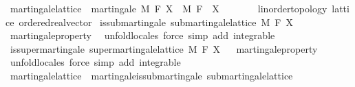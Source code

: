 \begin{isabellebody}
\isanewline
{}\isamarkupfalse%
\ martingale{\isacharunderscore}{\kern0pt}lattice\ {\isacharequal}{\kern0pt}\ martingale\ M\ F\ X\ \ M\ F\ \ X\ {\isacharcolon}{\kern0pt}{\isacharcolon}{\kern0pt}\ {\isachardoublequoteopen}{\isacharunderscore}{\kern0pt}\ {\isasymRightarrow}\ {\isacharunderscore}{\kern0pt}\ {\isasymRightarrow}\ {\isacharunderscore}{\kern0pt}\ {\isacharcolon}{\kern0pt}{\isacharcolon}{\kern0pt}\ {\isacharbraceleft}{\kern0pt}linorder{\isacharunderscore}{\kern0pt}topology{\isacharcomma}{\kern0pt}\ lattice{\isacharcomma}{\kern0pt}\ ordered{\isacharunderscore}{\kern0pt}real{\isacharunderscore}{\kern0pt}vector{\isacharbraceright}{\kern0pt}{\isachardoublequoteclose}\isanewline
{}\isanewline
\isanewline
{}\isamarkupfalse%
\ is{\isacharunderscore}{\kern0pt}submartingale{\isacharcolon}{\kern0pt}\ {\isachardoublequoteopen}submartingale{\isacharunderscore}{\kern0pt}lattice\ M\ F\ X{\isachardoublequoteclose}%
\isadelimproof
\ %
\endisadelimproof
%
\isatagproof
{}\isamarkupfalse%
\ martingale{\isacharunderscore}{\kern0pt}property\ \isamarkupfalse%
\ {\isacharparenleft}{\kern0pt}unfold{\isacharunderscore}{\kern0pt}locales{\isacharparenright}{\kern0pt}\ {\isacharparenleft}{\kern0pt}force\ simp\ add{\isacharcolon}{\kern0pt}\ integrable{\isacharparenright}{\kern0pt}{\isacharplus}{\kern0pt}%
\endisatagproof
{\isafoldproof}%
%
\isadelimproof
%
\endisadelimproof
\isanewline
\isanewline
{}\isamarkupfalse%
\ is{\isacharunderscore}{\kern0pt}supermartingale{\isacharcolon}{\kern0pt}\ {\isachardoublequoteopen}supermartingale{\isacharunderscore}{\kern0pt}lattice\ M\ F\ X{\isachardoublequoteclose}%
\isadelimproof
\ %
\endisadelimproof
%
\isatagproof
{}\isamarkupfalse%
\ martingale{\isacharunderscore}{\kern0pt}property\ \isamarkupfalse%
\ {\isacharparenleft}{\kern0pt}unfold{\isacharunderscore}{\kern0pt}locales{\isacharparenright}{\kern0pt}\ {\isacharparenleft}{\kern0pt}force\ simp\ add{\isacharcolon}{\kern0pt}\ integrable{\isacharparenright}{\kern0pt}{\isacharplus}{\kern0pt}%
\endisatagproof
{\isafoldproof}%
%
\isadelimproof
%
\endisadelimproof
\isanewline
\isanewline
{}\isamarkupfalse%
\isanewline
\isanewline
{}\isamarkupfalse%
\ martingale{\isacharunderscore}{\kern0pt}lattice\ {\isasymsubseteq}\ martingale{\isacharunderscore}{\kern0pt}is{\isacharunderscore}{\kern0pt}submartingale{\isacharcolon}{\kern0pt}\ submartingale{\isacharunderscore}{\kern0pt}lattice%
\isadelimproof
\ %
\endisadelimproof

\end{isabellebody}
